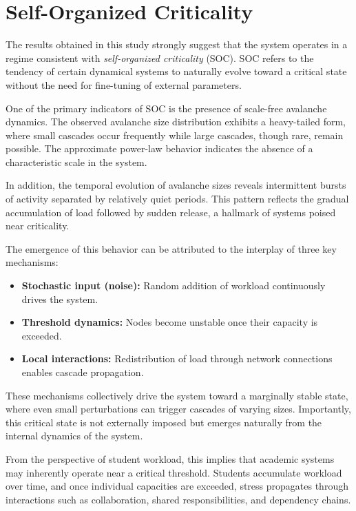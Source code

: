 \documentclass[12pt]{article}
\begin{document}
\section{Self-Organized Criticality}

The results obtained in this study strongly suggest that the system operates in a regime consistent with \textit{self-organized criticality} (SOC). SOC refers to the tendency of certain dynamical systems to naturally evolve toward a critical state without the need for fine-tuning of external parameters.

One of the primary indicators of SOC is the presence of scale-free avalanche dynamics. The observed avalanche size distribution exhibits a heavy-tailed form, where small cascades occur frequently while large cascades, though rare, remain possible. The approximate power-law behavior indicates the absence of a characteristic scale in the system.

In addition, the temporal evolution of avalanche sizes reveals intermittent bursts of activity separated by relatively quiet periods. This pattern reflects the gradual accumulation of load followed by sudden release, a hallmark of systems poised near criticality.

The emergence of this behavior can be attributed to the interplay of three key mechanisms:
\begin{itemize}
\item \textbf{Stochastic input (noise):} Random addition of workload continuously drives the system.
\item \textbf{Threshold dynamics:} Nodes become unstable once their capacity is exceeded.
\item \textbf{Local interactions:} Redistribution of load through network connections enables cascade propagation.
\end{itemize}

These mechanisms collectively drive the system toward a marginally stable state, where even small perturbations can trigger cascades of varying sizes. Importantly, this critical state is not externally imposed but emerges naturally from the internal dynamics of the system.

From the perspective of student workload, this implies that academic systems may inherently operate near a critical threshold. Students accumulate workload over time, and once individual capacities are exceeded, stress propagates through interactions such as collaboration, shared responsibilities, and dependency chains.
\end{document}
